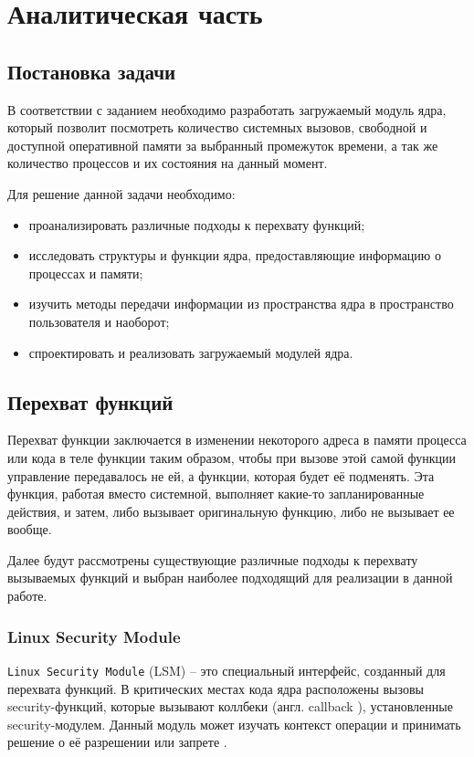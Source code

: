 \chapter{Аналитическая часть}

\section{Постановка задачи}

В соответствии с заданием необходимо разработать загружаемый модуль ядра, который позволит посмотреть количество системных вызовов, свободной и доступной оперативной памяти за выбранный промежуток времени, а так же количество процессов и их состояния на данный момент.

Для решение данной задачи необходимо:

\begin{itemize}
	\item проанализировать различные подходы к перехвату функций;
	\item исследовать структуры и функции ядра, предоставляющие информацию о процессах и памяти;
	\item изучить методы передачи информации из пространства ядра в пространство пользователя и наоборот;
	\item спроектировать и реализовать загружаемый модулей ядра.
\end{itemize}

\section{Перехват функций}

Перехват функции заключается в изменении некоторого адреса в памяти процесса или кода в теле функции таким образом, чтобы при вызове этой самой функции управление передавалось не ей, а функции, которая будет её подменять. Эта функция, работая вместо системной, выполняет какие-то запланированные действия, и затем, либо вызывает оригинальную функцию, либо не вызывает ее вообще.

Далее будут рассмотрены существующие различные подходы к перехвату вызываемых функций и выбран наиболее подходящий для реализации в данной работе.

\subsection{Linux Security Module}

\texttt{Linux Security Module} (LSM) \cite{linux-security-api} -- это специальный интерфейс, созданный для перехвата функций. В критических местах кода ядра расположены вызовы security-функций, которые вызывают коллбеки (англ. callback \cite{callback}), установленные security-модулем. Данный модуль может изучать контекст операции и принимать решение о её разрешении или запрете \cite{linux-security-api}.

